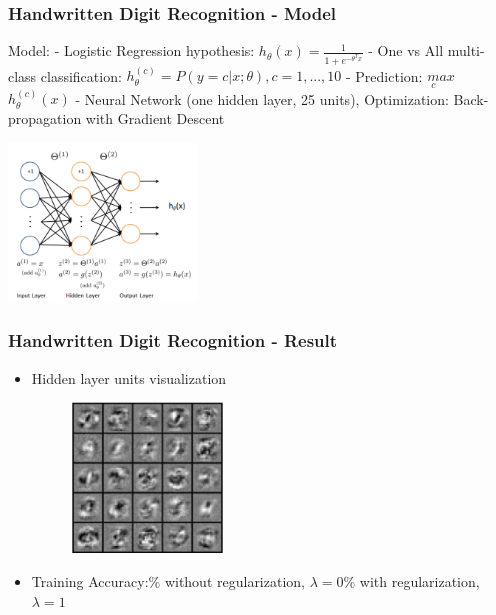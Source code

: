 
\begin{frame}
\frametitle{Handwritten Digit Recognition - Model}
Model:\newline
- Logistic Regression hypothesis: $h_\theta(x)=\frac{1}{1+e^{-
\theta^Tx}}$\newline
- One vs All multi-class classification: $h_\theta^{(c)}=P(y=c|x;\theta), c=1,...,10$\newline
- Prediction: $\underset{c}max$ $h_\theta^{(c)}(x)$\newline
- Neural Network  (one hidden layer, 25 units), Optimization: Back-propagation with Gradient Descent\newline
\begin{centering}
\includegraphics[width=5cm,keepaspectratio]{pictures/8_Neural_network_model}
\end{centering}
\end{frame}

\begin{frame}
\frametitle{Handwritten Digit Recognition - Result}
\begin{itemize}
\item Hidden layer units visualization \newline\newline
\begin{figure}
\begin{centering}
\includegraphics[width=4cm,keepaspectratio]{pictures/9_Visualizeing_hidden_layer}
\end{centering}
\end{figure}
\item Training Accuracy:\% without regularization, $\lambda=0$\% with regularization, $\lambda=1$ \newline
\end{itemize}
\end{frame}

